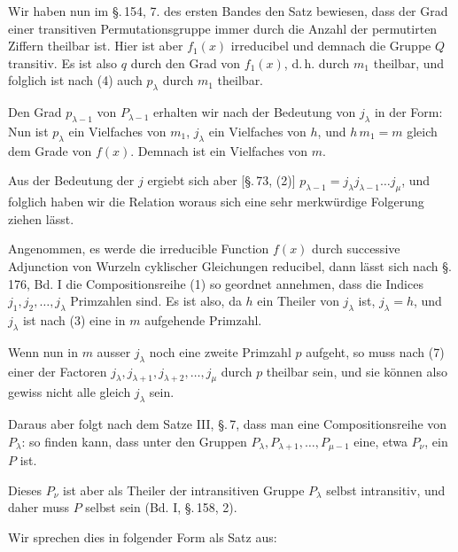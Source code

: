 Wir haben nun im §.\,154, 7. des ersten Bandes den Satz bewiesen, dass der Grad
einer transitiven Permutationsgruppe immer durch die Anzahl der permutirten
Ziffern theilbar ist. Hier ist aber $f_1(x)$ irreducibel und demnach die Gruppe
$Q$ transitiv. Es ist also $q$ durch den Grad von $f_1(x)$, d.\,h. durch $m_1$
theilbar, und folglich ist nach (4) auch $p_\lambda$ durch $m_1$ theilbar.

Den Grad $p_{\lambda-1}$ von $P_{\lambda-1}$ erhalten wir nach der Bedeutung von
$j_\lambda$ in der Form:
Nun ist $p_\lambda$ ein Vielfaches von $m_1$, $j_\lambda$ ein Vielfaches von $h$,
und $h\, m_1 = m$ gleich dem Grade von $f(x)$. Demnach ist
ein Vielfaches von $m$.

Aus der Bedeutung der $j$ ergiebt sich aber [§.\,73, (2)]
$p_{\lambda-1} = j_\lambda j_{\lambda-1} \ldots j_\mu$, %
und folglich haben wir die
Relation
woraus sich eine sehr merkwürdige Folgerung ziehen lässt.

Angenommen, es werde die irreducible Function $f(x)$ durch successive Adjunction
von Wurzeln cyklischer Gleichungen reducibel, dann lässt sich nach §.\,176, Bd. I
die Compositionsreihe (1) so geordnet annehmen, dass die Indices
$j_1, j_2, \ldots, j_\lambda$ Primzahlen sind. Es ist also, da $h$ ein Theiler von
$j_\lambda$ ist, $j_\lambda = h$, und $j_\lambda$ ist nach (3) eine in $m$
aufgehende Primzahl.

Wenn nun in $m$ ausser $j_\lambda$ noch eine zweite Primzahl $p$ aufgeht, so muss
nach (7) einer der Factoren $j_\lambda, j_{\lambda+1}, j_{\lambda+2}, \ldots, j_\mu$
durch $p$ theilbar sein, und sie können also gewiss nicht alle gleich $j_\lambda$
sein.

Daraus aber folgt nach dem Satze III, §.\,7, dass man eine Compositionsreihe von
$P_\lambda$:
so finden kann, dass unter den Gruppen $P_\lambda, P_{\lambda+1}, \ldots,
P_{\mu-1}$ eine, etwa $P_\nu$, ein  $P$ ist.

Dieses $P_\nu$ ist aber als Theiler der intransitiven Gruppe $P_\lambda$ selbst
intransitiv, und daher muss $P$ selbst  sein (Bd. I, §.\,158, 2).

Wir sprechen dies in folgender Form als Satz aus:

